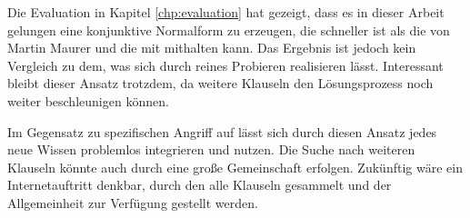Die Evaluation in Kapitel \ref{chp:evaluation} hat gezeigt, dass es in dieser Arbeit gelungen eine konjunktive Normalform zu erzeugen, die schneller
ist als die von Martin Maurer und die mit  mithalten kann. Das Ergebnis ist jedoch kein Vergleich zu dem, was sich durch reines Probieren
realisieren lässt. Interessant bleibt dieser Ansatz trotzdem, da weitere Klauseln den Lösungsprozess noch weiter beschleunigen können.

Im Gegensatz zu spezifischen Angriff auf  lässt sich durch diesen Ansatz jedes neue Wissen problemlos integrieren und nutzen.
Die Suche nach weiteren Klauseln könnte auch durch eine große Gemeinschaft erfolgen. Zukünftig wäre ein Internetauftritt denkbar, durch den
alle Klauseln gesammelt und der Allgemeinheit zur Verfügung gestellt werden.